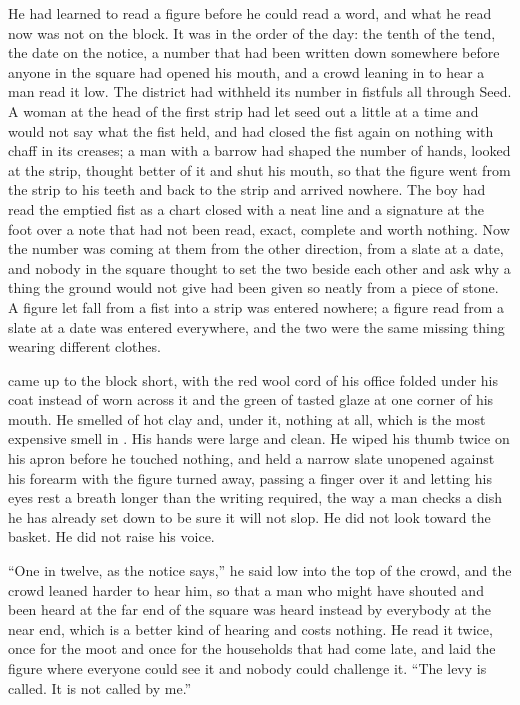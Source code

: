 He had learned to read a figure before he could read a word, and what he read now was not on the block. It was in the order of the day: the tenth of the tend, the date on the notice, a number that had been written down somewhere before anyone in the square had opened his mouth, and a crowd leaning in to hear a man read it low. The district had withheld its number in fistfuls all through Seed. A woman at the head of the first strip had let seed out a little at a time and would not say what the fist held, and had closed the fist again on nothing with chaff in its creases; a man with a barrow had shaped the number of hands, looked at the strip, thought better of it and shut his mouth, so that the figure went from the strip to his teeth and back to the strip and arrived nowhere. The boy had read the emptied fist as a chart closed with a neat line and a signature at the foot over a note that had not been read, exact, complete and worth nothing. Now the number was coming at them from the other direction, from a slate at a date, and nobody in the square thought to set the two beside each other and ask why a thing the ground would not give had been given so neatly from a piece of stone. A figure let fall from a fist into a strip was entered nowhere; a figure read from a slate at a date was entered everywhere, and the two were the same missing thing wearing different clothes.

 came up to the block short, with the red wool cord of his office folded under his coat instead of worn across it and the green of tasted glaze at one corner of his mouth. He smelled of hot clay and, under it, nothing at all, which is the most expensive smell in . His hands were large and clean. He wiped his thumb twice on his apron before he touched nothing, and held a narrow slate unopened against his forearm with the figure turned away, passing a finger over it and letting his eyes rest a breath longer than the writing required, the way a man checks a dish he has already set down to be sure it will not slop. He did not look toward the basket. He did not raise his voice.

“One in twelve, as the notice says,” he said low into the top of the crowd, and the crowd leaned harder to hear him, so that a man who might have shouted and been heard at the far end of the square was heard instead by everybody at the near end, which is a better kind of hearing and costs nothing. He read it twice, once for the moot and once for the households that had come late, and laid the figure where everyone could see it and nobody could challenge it. “The levy is called. It is not called by me.”

